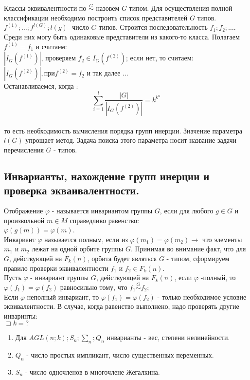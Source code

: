 Классы эквивалентности по $\stackrel{G}{\sim}$ назовем $G$-типом. Для осуществления полной классификации необходимо построить список представителей $G$ типов.
$f^{(1)};\dots; f^{l(G)}; l(g)$- число $G$-типов.
Строится последовательность $f_1;f_2;\dots $. Среди них могу быть одинаковые представители из какого-то класса. Полагаем $ f^{(1)}=f_1$ и считаем:\\ 
$|I_G(f^{(1)})|$, проверяем $f_2 \in I_G(f^{(2)})$; если нет, то считаем:\\
$|I_G(f^{(2)})|, при f^{(2)} =f_2$ и так далее $\dots$\\
Останавливаемся, когда :\\
$$ \sum_{i=1}^{l} \frac{|G|}{|I_G(f^{(2)})|} = k^{k^n} $$\\ то есть необходимость вычисления порядка групп инерции. Значение параметра $l(G)$ упрощает метод. Задача поиска этого параметра носит название задачи перечисления $G$ - типов.\\

\subsection{Инварианты, нахождение групп инерции и проверка экваивалентности.}

\opr 
Отображение $\varphi$ - называется инвариантом группы $G$, если для любого $g \in G$ и произвольной $m \in M$ справедливо равенство:\\
$\varphi(g(m))=\varphi(m)$.\\
Инвариант $\varphi$ называется полным, если из $\varphi (m_1) = \varphi(m_2) \rightarrow $ что элементы $m_1 $ и $m_2$ лежат на одной орбите группы $G$. Принимая во внимание факт, что для $G$, действующей на $F_k(n)$, орбита будет являться $G$ - типом, сформируем правило проверки эквивалентности $f_1 $ и $f_2 \in F_k(n)$.\\
Пусть $\varphi$ - инвариант группы $G$, действующей на $F_k(n)$, если $\varphi$ -полный, то $\varphi(f_1)=\varphi(f_2) $ равносильно тому, что $f_1 \stackrel{G}{\sim} f_2$;\\
Если $\varphi$ неполный инвариант, то $\varphi(f_1)=\varphi(f_2) $ - только необходимое условие эквивалентности.
В случае, когда равенство выполнено, надо проверять другие инваринты:\\

$\sqsupset k = ?$\\
\begin{enumerate}
	\item Для $AGL(n;k); S_n; \sum_n; Q_n $ инварианты - вес, степени нелинейности.
	\item $Q_n$ - число простых импликант, число существенных переменных.
	\item $S_n$ - число одночленов в многочлене Жегалкина.\\
\end{enumerate}

